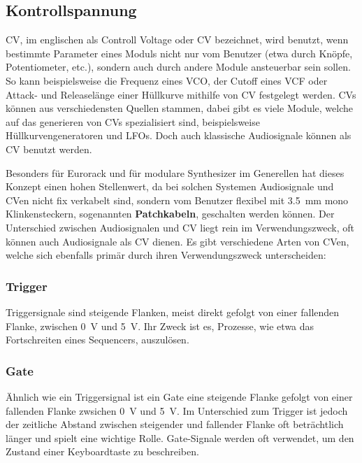 \subsection{Kontrollspannung \label{CV}}
\label{sec:orgd07570d}
\acl{CV}, im englischen als Controll Voltage oder \acs{CV} bezeichnet, wird benutzt, wenn bestimmte Parameter eines Moduls nicht nur vom Benutzer (etwa durch Knöpfe, Potentiometer, etc.), sondern auch durch andere Module ansteuerbar sein sollen. So kann beispielsweise die Frequenz eines \acs{VCO}, der Cutoff eines \ac{VCF} oder Attack- und Releaselänge einer Hüllkurve mithilfe von \acl{CV} festgelegt werden. \aclp{CV} können aus verschiedensten Quellen stammen, dabei gibt es viele Module, welche auf das generieren von \aclp{CV} spezialisiert sind, beispielsweise Hüllkurvengeneratoren und \acp{LFO}. Doch auch klassische Audiosignale können als \acl{CV} benutzt werden.

Besonders für Eurorack und für modulare Synthesizer im Generellen hat dieses Konzept einen hohen Stellenwert, da bei solchen Systemen Audiosignale und \acl{CV}en nicht fix verkabelt sind, sondern vom Benutzer flexibel mit \SI{3.5}{\milli\meter} mono Klinkensteckern, sogenannten \textbf{Patchkabeln}, geschalten werden können. Der Unterschied zwischen Audiosignalen und \acl{CV} liegt rein im Verwendungszweck, oft können auch Audiosignale als \acl{CV} dienen. Es gibt verschiedene Arten von \acl{CV}en, welche sich ebenfalls primär durch ihren Verwendungszweck unterscheiden:

\subsubsection{Trigger}
\label{sec:orga7f1990}
Triggersignale sind steigende Flanken, meist direkt gefolgt von einer fallenden Flanke, zwischen \SI{0}{\volt} und \SI{5}{\volt}. Ihr Zweck ist es, Prozesse, wie etwa das Fortschreiten eines Sequencers, auszulösen.

\subsubsection{Gate}
\label{sec:org19f3449}
Ähnlich wie ein Triggersignal ist ein Gate eine steigende Flanke gefolgt von einer fallenden Flanke zwsichen \SI{0}{\volt} und \SI{5}{\volt}. Im Unterschied zum Trigger ist jedoch der zeitliche Abstand zwischen steigender und fallender Flanke oft beträchtlich länger und spielt eine wichtige Rolle. Gate-Signale werden oft verwendet, um den Zustand einer Keyboardtaste zu beschreiben.

